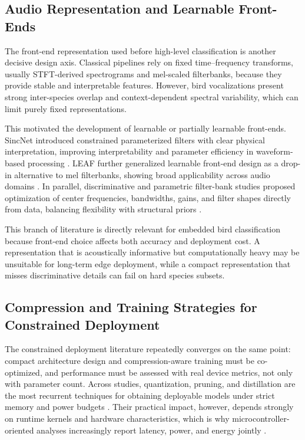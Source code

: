 \documentclass[a4paper,singleside,12pt]{report} %
\begin{document}
	\subsection{Audio Representation and Learnable Front-Ends}
	The front-end representation used before high-level classification is another decisive design axis. Classical pipelines rely on fixed time--frequency transforms, usually STFT-derived spectrograms and mel-scaled filterbanks, because they provide stable and interpretable features. However, bird vocalizations present strong inter-species overlap and context-dependent spectral variability, which can limit purely fixed representations.

	This motivated the development of learnable or partially learnable front-ends. SincNet introduced constrained parameterized filters with clear physical interpretation, improving interpretability and parameter efficiency in waveform-based processing \cite{ravanelli2019sincnet}. LEAF further generalized learnable front-end design as a drop-in alternative to mel filterbanks, showing broad applicability across audio domains \cite{zeghidour2021leaf}. In parallel, discriminative and parametric filter-bank studies proposed optimization of center frequencies, bandwidths, gains, and filter shapes directly from data, balancing flexibility with structural priors \cite{zhangwu2019discriminative,caiko2023parametric,peictukuljac2022learnable}.

	This branch of literature is directly relevant for embedded bird classification because front-end choice affects both accuracy and deployment cost. A representation that is acoustically informative but computationally heavy may be unsuitable for long-term edge deployment, while a compact representation that misses discriminative details can fail on hard species subsets.

	\subsection{Compression and Training Strategies for Constrained Deployment}
	The constrained deployment literature repeatedly converges on the same point: compact architecture design and compression-aware training must be co-optimized, and performance must be assessed with real device metrics, not only with parameter count. Across studies, quantization, pruning, and distillation are the most recurrent techniques for obtaining deployable models under strict memory and power budgets \cite{wuint8quant2020,li2019pruning,hinton2015distilling}. Their practical impact, however, depends strongly on runtime kernels and hardware characteristics, which is why microcontroller-oriented analyses increasingly report latency, power, and energy jointly \cite{tao2022energy}.
\end{document}

